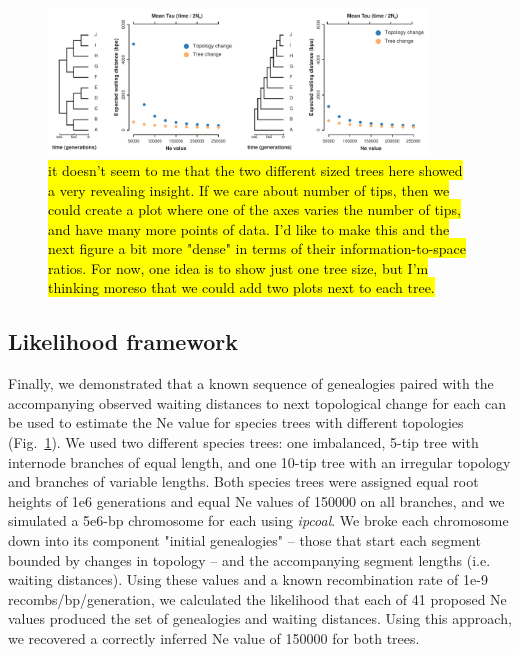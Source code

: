 \documentclass[11pt]{article}
\begin{document}
\begin{figure}[t]
	\centering
	\includegraphics[width=0.9\textwidth]{figures/Fig4-new-validation.pdf}
	\caption{
		\hl{it doesn't seem to me that the two different sized trees here showed a 
		very revealing insight. If we care about number of tips, then we could create a 
		plot where one of the axes varies the number of tips, and have many more
		points of data. I'd like to make this and the next figure a bit more 
		"dense" in terms of their information-to-space ratios. For now, one idea is
		to show just one tree size, but I'm thinking moreso that we could add two
		plots next to each tree.}
	}
	 \label{fig:fig4}
\end{figure}


\subsection{Likelihood framework}
Finally, we demonstrated that a known sequence of genealogies paired with the accompanying
observed waiting distances to next topological change for each can be used to estimate the 
Ne value for species trees with different topologies (Fig.~\ref{fig:fig4}). We used two 
different species trees: one imbalanced, 5-tip tree with internode branches of equal length,
and one 10-tip tree with an irregular topology and branches of variable lengths. Both species 
trees were assigned equal root heights of 1e6 generations and equal Ne values of 150000 on all 
branches, and we simulated a 5e6-bp chromosome for each using \emph{ipcoal}. We broke each 
chromosome down into its component "initial genealogies" -- those that start each segment 
bounded by changes in topology -- and the accompanying segment lengths (i.e. waiting 
distances). Using these values and a known recombination rate of 1e-9 recombs/bp/generation, 
we calculated the likelihood that each of 41 proposed Ne values produced the set of 
genealogies and waiting distances. Using this approach, we recovered a correctly inferred Ne 
value of 150000 for both trees.
\end{document}
